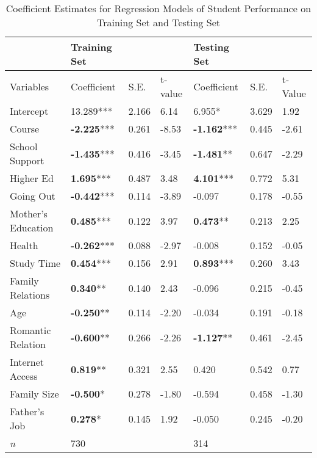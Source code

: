 \documentclass[sigconf]{acmart}
\begin{document}
\begin{table*}[ht]
  \caption{Coefficient Estimates for Regression Models of Student Performance on 
  Training Set and Testing Set}
  \label{tab:freq}
  \begin{tabular}{lllllll}
    \toprule
                        & Training Set      &        &         & Testing Set &         &          \\
    \midrule
    Variables           & Coefficient        & S.E.  & t-value & Coefficient & S.E. & t-Value  \\
    \midrule
    Intercept           &       13.289***    & 2.166 &  6.14  &          6.955*     & 3.629 &  1.92 \\
    Course              & \textbf{-2.225}*** & 0.261 & -8.53  & \textbf{-1.162}***  & 0.445 & -2.61 \\
    School Support      & \textbf{-1.435}*** & 0.416 & -3.45  & \textbf{-1.481}**   & 0.647 & -2.29 \\
    Higher Ed           & \textbf{ 1.695}*** & 0.487 &  3.48  & \textbf{ 4.101}***  & 0.772 &  5.31 \\
    Going Out           & \textbf{-0.442}*** & 0.114 & -3.89  &         -0.097      & 0.178 & -0.55 \\
    Mother's Education  & \textbf{ 0.485}*** & 0.122 &  3.97  & \textbf{ 0.473}**   & 0.213 &  2.25 \\
    Health              & \textbf{-0.262}*** & 0.088 & -2.97  &         -0.008      & 0.152 & -0.05 \\
    Study Time          & \textbf{ 0.454}*** & 0.156 &  2.91  & \textbf{ 0.893}***  & 0.260 &  3.43 \\
    Family Relations    & \textbf{ 0.340}**  & 0.140 &  2.43  &         -0.096      & 0.215 & -0.45 \\
    Age                 & \textbf{-0.250}**  & 0.114 & -2.20  &         -0.034      & 0.191 & -0.18 \\
    Romantic Relation   & \textbf{-0.600}**  & 0.266 & -2.26  & \textbf{-1.127}**   & 0.461 & -2.45 \\
    Internet Access     & \textbf{ 0.819}**  & 0.321 &  2.55  &          0.420      & 0.542 &  0.77 \\
    Family Size         & \textbf{-0.500}*   & 0.278 & -1.80  &         -0.594      & 0.458 & -1.30 \\
    Father's Job        & \textbf{ 0.278}*   & 0.145 &  1.92  &         -0.050      & 0.245 & -0.20 \\
    \midrule
    \textit{n}          &       730          &       &        &         314         &       &       \\

\end{tabular}
\end{table*}
\end{document}
